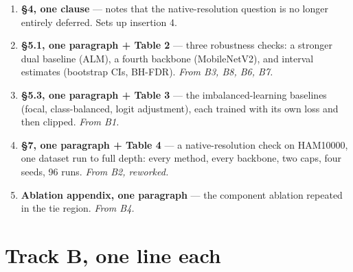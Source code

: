 \documentclass[11pt,a4paper]{article}
\begin{document}
\begin{enumerate}[leftmargin=1.5em]
\item \textbf{\S4, one clause} --- notes that the native-resolution question is no longer
entirely deferred. Sets up insertion 4.

\item \textbf{\S5.1, one paragraph + Table 2} --- three robustness checks:
a stronger dual baseline (ALM), a fourth backbone (MobileNetV2), and interval estimates
(bootstrap CIs, BH-FDR). \emph{From B3, B8, B6, B7.}

\item \textbf{\S5.3, one paragraph + Table 3} --- the imbalanced-learning baselines
(focal, class-balanced, logit adjustment), each trained with its own loss and then
clipped. \emph{From B1.}

\item \textbf{\S7, one paragraph + Table 4} --- a native-resolution check on HAM10000, one
dataset run to full depth: every method, every backbone, two caps, four seeds, 96 runs.
\emph{From B2, reworked.}

\item \textbf{Ablation appendix, one paragraph} --- the component ablation repeated in the
tie region. \emph{From B4.}
\end{enumerate}

\section{Track B, one line each}
\end{document}
